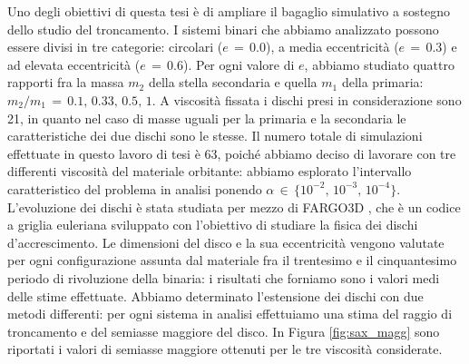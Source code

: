 \documentclass[12pt, a4paper]{report}
\begin{document}
Uno degli obiettivi di questa tesi è di ampliare il bagaglio simulativo a sostegno dello studio del troncamento.
I sistemi binari che abbiamo analizzato possono essere divisi in tre categorie: circolari ($e\,=\,0.0$), a media eccentricità ($e\,=\,0.3$) e ad elevata eccentricità ($e\,=\,0.6$).
Per ogni valore di $e$, abbiamo studiato quattro rapporti fra la massa $m_2$ della stella secondaria e quella $m_1$ della primaria: $m_2/m_1\,=\,0.1,\,0.33,\,0.5,\,1$.
A viscosità fissata i dischi presi in considerazione sono 21, in quanto nel caso di masse uguali per la primaria e la secondaria le caratteristiche dei due dischi sono le stesse.
Il numero totale di simulazioni effettuate in questo lavoro di tesi è 63, poiché abbiamo deciso di lavorare con tre differenti viscosità del materiale orbitante: abbiamo esplorato l'intervallo caratteristico del problema in analisi ponendo $\alpha\,\in\,\{10^{-2},\, 10^{-3},\,10^{-4}\}$.
L'evoluzione dei dischi è stata studiata per mezzo di FARGO3D \parencite{Fargo3D}, che è un codice a griglia euleriana sviluppato con l'obiettivo di studiare la fisica dei dischi d'accrescimento.
Le dimensioni del disco e la sua eccentricità vengono valutate per ogni configurazione assunta dal materiale fra il trentesimo e il cinquantesimo periodo di rivoluzione della binaria: i risultati che forniamo sono i valori medi delle stime effettuate.
Abbiamo determinato l'estensione dei dischi con due metodi differenti: per ogni sistema in analisi effettuiamo una stima del raggio di troncamento e del semiasse maggiore del disco. In Figura \ref{fig:sax_magg} sono riportati i valori di semiasse maggiore ottenuti per le tre viscosità considerate.
\end{document}
